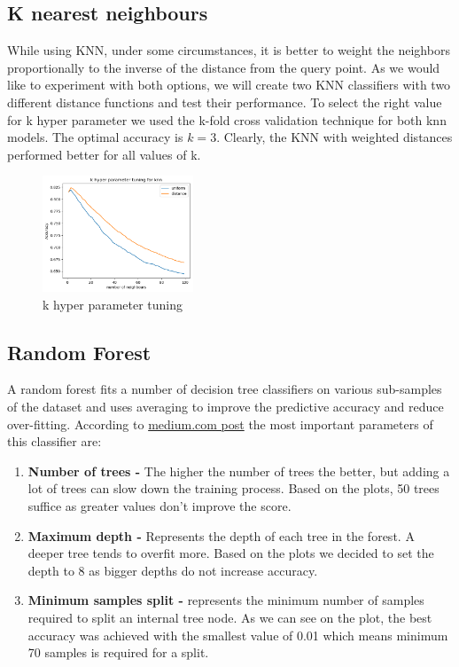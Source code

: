 \documentclass[12pt]{article}
\begin{document}
\subsection{K nearest neighbours}
While using KNN, under some circumstances, it is better to weight the neighbors proportionally to the inverse of the distance from the query point. As we would like to experiment with both options, we will create two KNN classifiers with two different distance functions and test their performance. To select the right value for k hyper parameter we used the k-fold cross validation technique for both knn models. The optimal accuracy is $k=3$. Clearly, the KNN with weighted distances performed better for all values of k.
\begin{figure}[h]
\centering
\includegraphics[width=0.4\textwidth]{Cross_valid_plots/k_hyper_fig}
\caption{k hyper parameter tuning}
\end{figure}

\subsection{Random Forest}
A random forest fits a number of decision tree classifiers on various sub-samples of the dataset and uses averaging to improve the predictive accuracy and reduce over-fitting. According to \href{https://medium.com/all-things-ai/in-depth-parameter-tuning-for-random-forest-d67bb7e920d}{medium.com post} the most important parameters of this classifier are:
\begin{enumerate}
	\item \textbf{Number of trees -} The higher the number of trees the better, but adding a lot of trees can slow down the training process. Based on the plots, 50 trees suffice as greater values don't improve the score.
	\item \textbf{Maximum depth -} Represents the depth of each tree in the forest. A deeper tree tends to overfit more. Based on the plots we decided to set the depth to 8 as bigger depths do not increase accuracy.
	\item \textbf{Minimum samples split -} represents the minimum number of samples required to split an internal tree node. As we can see on the plot, the best accuracy was achieved with the smallest value of 0.01 which means minimum 70 samples is required for a split.
\end{enumerate}
\end{document}
